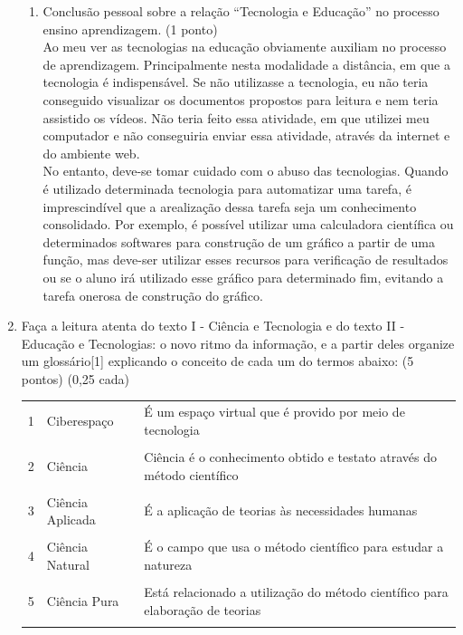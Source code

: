 \documentclass[a4paper, 12pt]{article}
\begin{document}
\begin{enumerate}
\begin{enumerate}
  \item Conclusão pessoal sobre a relação “Tecnologia e Educação” no processo ensino aprendizagem. (1 ponto) \\
    Ao meu ver as tecnologias na educação obviamente auxiliam no processo de aprendizagem. Principalmente nesta modalidade a distância, em que a tecnologia é indispensável. Se não utilizasse a tecnologia, eu não teria conseguido visualizar os documentos propostos para leitura e nem teria assistido os vídeos. Não teria feito essa atividade, em que utilizei meu computador e não conseguiria enviar essa atividade, através da internet e do ambiente web. \\
    No entanto, deve-se tomar cuidado com o abuso das tecnologias. Quando é utilizado determinada tecnologia para automatizar uma tarefa, é imprescindível que a arealização dessa tarefa seja um conhecimento consolidado. Por exemplo, é possível utilizar uma calculadora científica ou determinados softwares para construção de um gráfico a partir de uma função, mas deve-ser utilizar esses recursos para verificação de resultados ou se o aluno irá utilizado esse gráfico para determinado fim, evitando a tarefa onerosa de construção do gráfico.
  \end{enumerate}
  \item Faça a leitura atenta do texto I  - Ciência e  Tecnologia e   do texto II -  Educação e Tecnologias: o novo ritmo da informação,   e a partir deles organize um glossário[1] explicando o conceito de cada um do termos abaixo: (5 pontos) (0,25 cada) \\
    \begin{tabular}{|m{0.5cm}|m{5cm}|m{8cm}|}
      \hline
      1 & Ciberespaço & É um espaço virtual que é provido por meio de tecnologia  \\ \\
      \hline
      2 & Ciência & Ciência é o conhecimento obtido e testato através do método científico \\ \\
      \hline
      3 & Ciência Aplicada & É a aplicação de teorias às necessidades humanas \\ \\
      \hline
      4 & Ciência Natural & É o campo que usa o método científico para estudar a natureza \\ \\
      \hline
      5 & Ciência Pura & Está relacionado a utilização do método científico para elaboração de teorias \\ \\

\end{tabular}
\end{enumerate}
\end{document}
